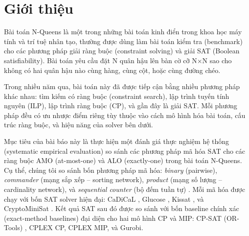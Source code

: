 \documentclass[a4paper,fleqn]{cas-sc}
\begin{document}
\begin{abstract}[english]
The N-Queens problem asks to place N queens on an N$\times$N board such that no two queens attack each other. This paper presents a systematic empirical evaluation comparing four AMO/ALO encoding methods (binary, commander, product, sequential counter) combined with four SAT solvers (CaDiCaL, Glucose, Kissat, CryptoMiniSat) against four CP/ILP baselines (CP-SAT, CPLEX CP, CPLEX MIP, Gurobi) across board sizes N = 8..30. Results show that binary encoding with Glucose4 achieves the fastest solving time at most N, while sequential counter produces the fewest clauses but introduces many auxiliary variables. SAT solvers generally outperform CP-SAT at larger N, although CP-SAT is more stable at small N. An open-source framework based on PySAT and OR-Tools is released on GitHub for reproducibility.

\end{abstract}

\maketitle

\section{Giới thiệu}
\label{sec:intro}

Bài toán N-Queens là một trong những bài toán kinh điển trong khoa học máy tính và trí tuệ nhân tạo, thường được dùng làm bài toán kiểm tra (benchmark) cho các phương pháp giải ràng buộc (constraint solving) và giải SAT (Boolean satisfiability). Bài toán yêu cầu đặt N quân hậu lên bàn cờ cỡ N$\times$N sao cho không có hai quân hậu nào cùng hàng, cùng cột, hoặc cùng đường chéo.

Trong nhiều năm qua, bài toán này đã được tiếp cận bằng nhiều phương pháp khác nhau: tìm kiếm có ràng buộc (constraint search), lập trình tuyến tính nguyên (ILP), lập trình ràng buộc (CP), và gần đây là giải SAT. Mỗi phương pháp đều có ưu nhược điểm riêng tùy thuộc vào cách mô hình hóa bài toán, cấu trúc ràng buộc, và hiệu năng của solver bên dưới.

Mục tiêu của bài báo này là thực hiện một đánh giá thực nghiệm hệ thống (systematic empirical evaluation) so sánh các phương pháp mã hóa SAT cho các ràng buộc AMO (at-most-one) và ALO (exactly-one) trong bài toán N-Queens. Cụ thể, chúng tôi so sánh bốn phương pháp mã hóa: \textit{binary} (pairwise), \textit{commander} (mạng sắp xếp -- sorting network), \textit{product} (mạng số lượng -- cardinality network), và \textit{sequential counter} (bộ đếm tuần tự) \citep{sinz2005towards, een2005translating}. Mỗi mã hóa được chạy với bốn SAT solver hiện đại: CaDiCaL \citep{biere2020cadical}, Glucose \citep{audemard2009predicting}, Kissat \citep{biere2021kissat}, và CryptoMiniSat \citep{soos2009cryptominisat}. Kết quả SAT sau đó được so sánh với bốn baseline chính xác (exact-method baselines) đại diện cho hai mô hình CP và MIP: CP-SAT (OR-Tools) \citep{perron2019ortools}, CPLEX CP, CPLEX MIP, và Gurobi.
\end{document}
